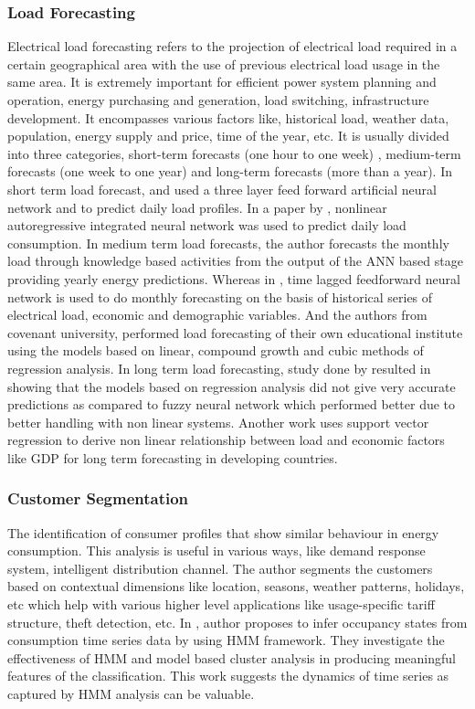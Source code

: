 \documentclass[conference]{IEEEtran}
\begin{document}
\subsubsection{Load Forecasting}
Electrical load forecasting refers to the projection of electrical load required in a certain geographical area with the use of previous electrical load usage in the same area. It is extremely important for efficient power system planning and operation, energy purchasing and generation, load switching, infrastructure development. It encompasses various factors like, historical load, weather data, population, energy supply and price, time of the year, etc.
It is usually divided into three categories, short-term forecasts (one hour to one week) , medium-term forecasts (one week to one year) and long-term forecasts (more than a year).
In short term load forecast, \cite{Bakirtzis} and \cite{Chen} used a three layer feed forward artificial neural network and to predict daily load profiles. In a paper by \cite{Chow}, nonlinear autoregressive integrated neural network was used to predict daily load consumption.
In medium term load forecasts, the author forecasts \cite{Falvo} the monthly load through knowledge based activities from the output of the ANN based stage providing yearly energy predictions. Whereas in \cite{bassi}, time lagged feedforward neural network is used to do monthly forecasting on the basis of historical series of electrical load, economic and demographic variables. And the authors from covenant university, \cite{samuel} performed load forecasting of their own educational institute using the models based on linear, compound growth and cubic methods of regression analysis.
In long term load forecasting, study done by \cite{Daneshi} resulted in showing that the models based on regression analysis did not give very accurate predictions as compared to fuzzy neural network which performed better due to better handling with non linear systems. Another work  \cite{Zhang} uses support vector regression to derive non linear relationship between load and economic factors like GDP for long term forecasting in developing countries.



\subsubsection{Customer Segmentation}
The identification of consumer profiles that show similar behaviour in energy consumption. This analysis is useful in various ways, like demand response system, intelligent distribution channel. The author \cite{wijaya2014consumer} segments the customers based on contextual dimensions like location, seasons, weather patterns, holidays, etc which help with various higher level applications like usage-specific tariff structure, theft detection, etc. In \cite{Albert}, author proposes to infer occupancy states from consumption time series data by using HMM framework. They investigate the effectiveness of HMM and model based cluster analysis in producing meaningful features of the classification. This work suggests the dynamics of time series as captured by HMM analysis can be valuable.
\end{document}
